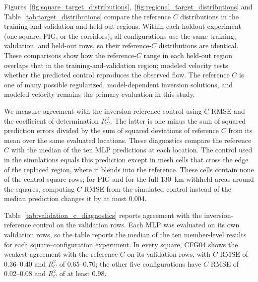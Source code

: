 \documentclass[review,jog]{igs}
\begin{document}
Figures~\ref{fig:square_target_distributions},~\ref{fig:regional_target_distributions} and Table~\ref{tab:target_distributions} compare the reference $C$ distributions in the training-and-validation and held-out regions. Within each holdout experiment (one square, PIG, or the corridors), all configurations use the same training, validation, and held-out rows, so their reference-$C$ distributions are identical. These comparisons show how the reference-$C$ range in each held-out region overlaps that in the training-and-validation region; modeled velocity tests whether the predicted control reproduces the observed flow. The reference $C$ is one of many possible regularized, model-dependent inversion solutions, and modeled velocity remains the primary evaluation in this study.

We measure agreement with the inversion-reference control using $C$ RMSE and the coefficient of determination $R_C^2$. The latter is one minus the sum of squared prediction errors divided by the sum of squared deviations of reference $C$ from its mean over the same evaluated locations. These diagnostics compare the reference $C$ with the median of the ten MLP predictions at each location. The control used in the simulations equals this prediction except in mesh cells that cross the edge of the replaced region, where it blends into the reference. These cells contain none of the central-square rows; for PIG and for the full 130~km withheld areas around the squares, computing $C$ RMSE from the simulated control instead of the median prediction changes it by at most 0.004.

Table~\ref{tab:validation_c_diagnostics} reports agreement with the inversion-reference control on the validation rows. Each MLP was evaluated on its own validation rows, so the table reports the median of the ten member-level results for each square--configuration experiment. In every square, CFG04 shows the weakest agreement with the reference $C$ on its validation rows, with $C$ RMSE of 0.36--0.40 and $R_C^2$ of 0.65--0.70; the other five configurations have $C$ RMSE of 0.02--0.08 and $R_C^2$ of at least 0.98. 
\end{document}
